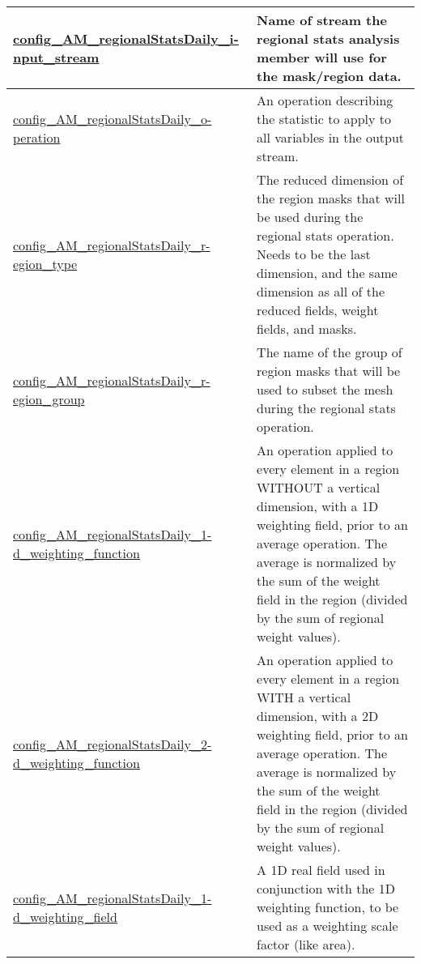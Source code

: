 {\begin{center}
\begin{longtable}{| p{2.0in} || p{4.0in} |}
    \hline
    \hyperref[subsec:nm_sec_config_AM_regionalStatsDaily_input_stream]{config\_AM\_regionalStatsDaily\_i-}\hyperref[subsec:nm_sec_config_AM_regionalStatsDaily_input_stream]{nput\_stream}& Name of stream the regional stats analysis member will use for the mask/region data. \\
    \hline
    \hyperref[subsec:nm_sec_config_AM_regionalStatsDaily_operation]{config\_AM\_regionalStatsDaily\_o-}\hyperref[subsec:nm_sec_config_AM_regionalStatsDaily_operation]{peration}& An operation describing the statistic to apply to all variables in the output stream. \\
    \hline
    \hyperref[subsec:nm_sec_config_AM_regionalStatsDaily_region_type]{config\_AM\_regionalStatsDaily\_r-}\hyperref[subsec:nm_sec_config_AM_regionalStatsDaily_region_type]{egion\_type}& The reduced dimension of the region masks that will be used during the regional stats operation. Needs to be the last dimension, and the same dimension as all of the reduced fields, weight fields, and masks. \\
    \hline
    \hyperref[subsec:nm_sec_config_AM_regionalStatsDaily_region_group]{config\_AM\_regionalStatsDaily\_r-}\hyperref[subsec:nm_sec_config_AM_regionalStatsDaily_region_group]{egion\_group}& The name of the group of region masks that will be used to subset the mesh during the regional stats operation. \\
    \hline
    \hyperref[subsec:nm_sec_config_AM_regionalStatsDaily_1d_weighting_function]{config\_AM\_regionalStatsDaily\_1-}\hyperref[subsec:nm_sec_config_AM_regionalStatsDaily_1d_weighting_function]{d\_weighting\_function}& An operation applied to every element in a region WITHOUT a vertical dimension, with a 1D weighting field, prior to an average operation. The average is normalized by the sum of the weight field in the region (divided by the sum of regional weight values). \\
    \hline
    \hyperref[subsec:nm_sec_config_AM_regionalStatsDaily_2d_weighting_function]{config\_AM\_regionalStatsDaily\_2-}\hyperref[subsec:nm_sec_config_AM_regionalStatsDaily_2d_weighting_function]{d\_weighting\_function}& An operation applied to every element in a region WITH a vertical dimension, with a 2D weighting field, prior to an average operation. The average is normalized by the sum of the weight field in the region (divided by the sum of regional weight values). \\
    \hline
    \hyperref[subsec:nm_sec_config_AM_regionalStatsDaily_1d_weighting_field]{config\_AM\_regionalStatsDaily\_1-}\hyperref[subsec:nm_sec_config_AM_regionalStatsDaily_1d_weighting_field]{d\_weighting\_field}& A 1D real field used in conjunction with the 1D weighting function, to be used as a weighting scale factor (like area). \\

\end{longtable}
\end{center}}
